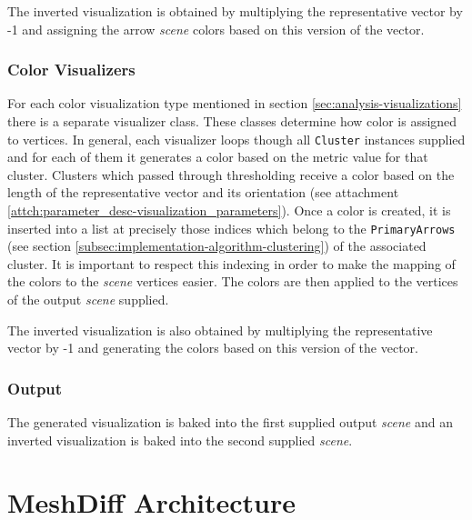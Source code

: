 The inverted visualization is obtained by multiplying the representative vector by -1 and assigning the arrow {\it scene} colors based on this version of the vector.

\subsubsection{Color Visualizers}

For each color visualization type mentioned in section \ref{sec:analysis-visualizations} there is a separate visualizer class. These classes determine how color is assigned to vertices. In general, each visualizer loops though all \verb+Cluster+ instances supplied and for each of them it generates a color based on the metric value for that cluster. Clusters which passed through thresholding receive a color based on the length of the representative vector and its orientation (see attachment \ref{attch:parameter_desc-visualization_parameters}). Once a color is created, it is inserted into a list at precisely those indices which belong to the \verb+PrimaryArrows+ (see section \ref{subsec:implementation-algorithm-clustering}) of the associated cluster. It is important to respect this indexing in order to make the mapping of the colors to the {\it scene} vertices easier. The colors are then applied to the vertices of the output {\it scene} supplied\footnotemark.

The inverted visualization is also obtained by multiplying the representative vector by -1 and generating the colors based on this version of the vector.


\subsubsection{Output}

The generated visualization is baked into the first supplied output {\it scene} and an inverted visualization is baked into the second supplied {\it scene}.
\section{MeshDiff Architecture}
\label{sec:implementation-architecture}

